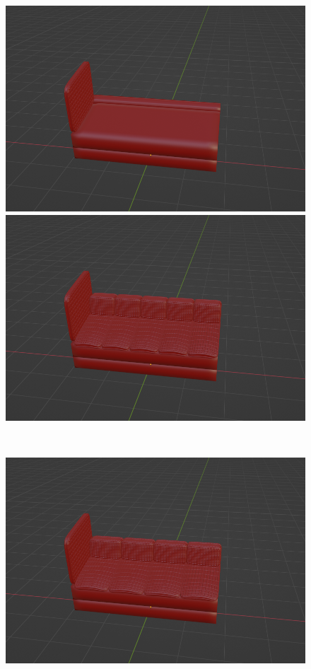 \begin{figure}[h]
 \begin{minipage}[b]{0.48\linewidth}
  \centering
  \includegraphics[scale=0.17]{./imgs/sofaParamMean/numCushionMin.png}
 \end{minipage}
 \begin{minipage}[b]{0.48\linewidth}
  \centering
  \includegraphics[scale=0.17]{./imgs/sofaParamMean/numCushionMax.png}
 \end{minipage}\\
  \begin{minipage}[b]{0.48\linewidth}
  \centering
  \includegraphics[scale=0.17]{./imgs/sofaParamMean/cushionTicknessMin.png}

\end{minipage}
\end{figure}
